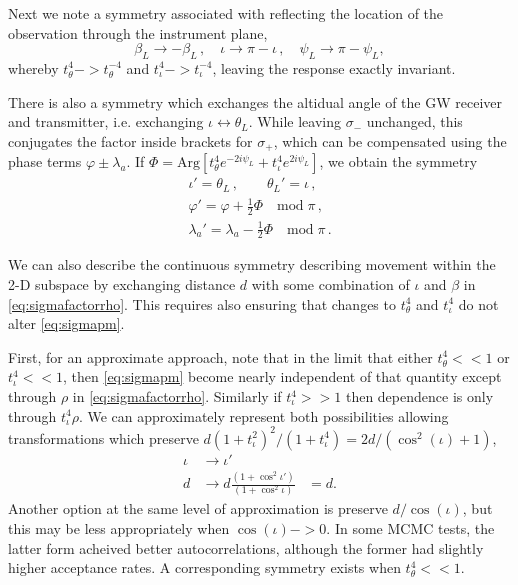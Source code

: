 \documentclass[aps,showpacs,twocolumn,prd,superscriptaddress,nofootinbib]{revtex4}
\newcommand{\be}{\begin{equation}}
\newcommand{\ee}{\end{equation}}
\newcommand{\nn}{\nonumber}
\newcommand\betaL{{\beta_{L}}}
\newcommand\psiL{{\psi_{L}}}
\begin{document}
Next we note a symmetry associated with reflecting the location of the observation through the instrument plane, 
\be\label{eq:symmetryresponse}
\betaL \rightarrow -\betaL\,, \quad \iota \rightarrow \pi - \iota \,, \quad \psiL \rightarrow \pi - \psiL,
\ee
whereby  $t^4_{\theta}->t^{-4}_{\theta}$ and $t^4_{\iota}->t^{-4}_{\iota}$,
leaving the response exactly invariant.

There is also a symmetry which exchanges the altidual angle of the GW receiver and transmitter, i.e. exchanging $\iota \leftrightarrow \theta_{L}$. While leaving $\sigma_-$ unchanged, this conjugates the factor inside brackets for $\sigma_{+}$, which can be compensated using the phase terms $\varphi \pm \lambda_{a}$. If $\Phi = \mathrm{Arg} \left[ t_{\theta}^{4} e^{-2 i \psiL} + t_{\iota}^{4} e^{2 i \psiL} \right]$, we obtain the symmetry
\begin{align}
	\iota' = \theta_{L} \,, \qquad \theta_{L}' = \iota \,, \nn\\
	\varphi' = \varphi + \frac{1}{2} \Phi \quad \mathrm{mod} \; \pi\,, \nn\\
	\lambda_{a}' = \lambda_{a} - \frac{1}{2} \Phi \quad \mathrm{mod} \; \pi\,.
\end{align}

We can also describe the continuous symmetry describing movement within the 2-D subspace by exchanging distance $d$ with some combination of $\iota$ and $\beta$ in  \eqref{eq:sigmafactorrho}.  This requires also ensuring that changes to $t^4_{\theta}$ and $t^4_{\iota}$ do not alter \eqref{eq:sigmapm}.

First, for an approximate approach, note that in the limit that either $t^4_\theta<<1$ or $t^4_\iota<<1$, then \eqref{eq:sigmapm} become nearly independent of that quantity except through  $\rho$ in \eqref{eq:sigmafactorrho}. Similarly if $t^4_\iota>>1$ then dependence is only through $t^4_\iota\rho$. We can approximately represent both possibilities allowing transformations which preserve $d(1+t^2_\iota)^2/(1+t^4_\iota)=2d/(\cos^2(\iota)+1)$,
\begin{align}
  \iota&\rightarrow\iota'\\
  d&\rightarrow d\frac{(1+\cos^2{\iota'})}{(1+\cos^2{\iota})}&=d.
\end{align}
Another option at the same level of approximation is preserve $d/\cos(\iota)$, but this may be less appropriately when $\cos(\iota)->0$.  In some MCMC tests, the latter form acheived better autocorrelations, although the former had slightly higher acceptance rates. A corresponding symmetry exists when $t^4_\theta<<1$.  
\end{document}
